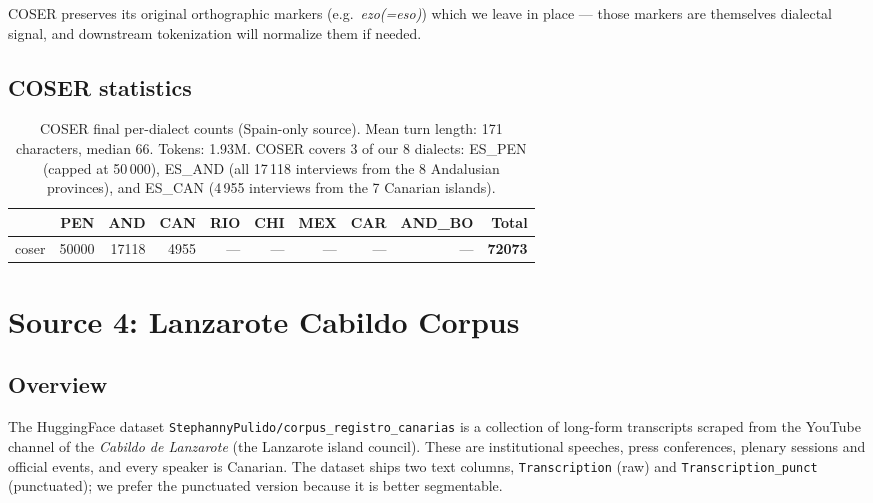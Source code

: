 \documentclass[11pt,a4paper]{article}
\begin{document}
COSER preserves its original orthographic markers (e.g.\ \emph{ezo(=eso)})
which we leave in place --- those markers are themselves dialectal signal,
and downstream tokenization will normalize them if needed.

\subsection{COSER statistics}

\begin{table}[h]
\centering
\begin{tabular}{l r r r r r r r r r}
\toprule
 & \textbf{PEN} & \textbf{AND} & \textbf{CAN} & \textbf{RIO} & \textbf{CHI} & \textbf{MEX} & \textbf{CAR} & \textbf{AND\_BO} & \textbf{Total} \\
\midrule
coser & \num{50000} & \num{17118} & \num{4955} & --- & --- & --- & --- & --- & \textbf{\num{72073}} \\
\bottomrule
\end{tabular}
\caption{COSER final per-dialect counts (Spain-only source). Mean turn
length: 171 characters, median 66. Tokens: 1.93M. COSER covers 3 of our 8
dialects: ES\_PEN (capped at 50\,000), ES\_AND (all 17\,118 interviews
from the 8 Andalusian provinces), and ES\_CAN (4\,955 interviews from
the 7 Canarian islands).}
\label{tab:coser-stats}
\end{table}

\section{Source 4: Lanzarote Cabildo Corpus}

\subsection{Overview}

The HuggingFace dataset
\texttt{StephannyPulido/corpus\_registro\_canarias} is a collection of
long-form transcripts scraped from the YouTube channel of the
\emph{Cabildo de Lanzarote} (the Lanzarote island council). These are
institutional speeches, press conferences, plenary sessions and official
events, and every speaker is Canarian. The dataset ships two text
columns, \texttt{Transcription} (raw) and \texttt{Transcription\_punct}
(punctuated); we prefer the punctuated version because it is better
segmentable.
\end{document}
